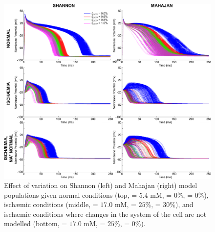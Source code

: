 \documentclass[../thesis-main.tex]{subfiles}
\begin{document}
\begin{figure}
 \centering
 \includegraphics[width=\textwidth]{fkatp-ap}
 \caption[Effect of \fkatp{} variation on Shannon and Mahajan model populations.]{Effect of \fkatp{} variation on Shannon (left) and Mahajan (right) model populations given normal conditions (top, \ko = $5.4$ mM, \finhib{} = $0\%$, \fna{} = $0\%$), isch\ae{}mic conditions (middle, \ko = $17.0$ mM, \finhib{} = $25\%$, \fna{} = $30\%$), and isch\ae{}mic conditions where changes in the \na{} system of the cell are not modelled (bottom, \ko = $17.0$ mM, \finhib{} = $25\%$, \fna{} = $0\%$).}
 \label{fig:fkatp-ap}
\end{figure}



\end{document}
